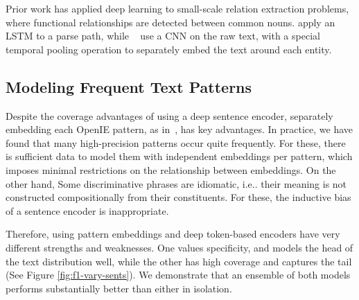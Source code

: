 Prior work has applied deep learning to small-scale relation extraction problems, where functional relationships are detected between common nouns. \citet{xu2015classifying} apply an LSTM to a parse path, while ~\citet{zengdistant} use a CNN on the raw text, with a special temporal pooling operation to separately embed the text around each entity.

\subsection{Modeling Frequent Text Patterns}
\label{sec:non-comp}

Despite the coverage advantages of using a deep sentence encoder, separately embedding each OpenIE pattern, as in~\citet{limin}, has key advantages. In practice, we have found that many high-precision patterns occur quite frequently. For these, there is sufficient data to model them with independent embeddings per pattern, which imposes minimal restrictions on the relationship between embeddings. On the other hand, Some discriminative phrases are idiomatic, i.e.. their meaning is not constructed compositionally from their constituents. For these, the inductive bias of a sentence encoder is inappropriate. 

Therefore, using pattern embeddings and deep token-based encoders have very different strengths and weaknesses. One values specificity, and models the head of the text distribution well, while the other has high coverage and captures the tail (See Figure \ref{fig:f1-vary-sents}). We demonstrate that an ensemble of both models performs substantially better than either in isolation.



